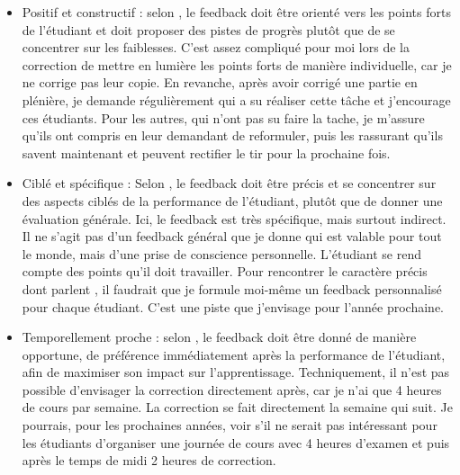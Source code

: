 \begin{itemize}
    \item Positif et constructif : selon \citet{hattie2007power}, le feedback doit être orienté vers les points forts de l'étudiant et doit proposer des pistes de progrès plutôt que de se concentrer sur les faiblesses. C'est assez compliqué pour moi lors de la correction de mettre en lumière les points forts de manière individuelle, car je ne corrige pas leur copie. En revanche, après avoir corrigé une partie en plénière, je demande régulièrement qui a su réaliser cette tâche et j’encourage ces étudiants. Pour les autres, qui n'ont pas su faire la tache, je m'assure qu'ils ont compris en leur demandant de reformuler, puis les rassurant qu’ils savent maintenant et peuvent rectifier le tir pour la prochaine fois.
    \item Ciblé et spécifique : Selon \citet{black1998assessment}, le feedback doit être précis et se concentrer sur des aspects ciblés de la performance de l'étudiant, plutôt que de donner une évaluation générale. Ici, le feedback est très spécifique, mais surtout indirect. Il ne s'agit pas d'un feedback général que je donne qui est valable pour tout le monde, mais d'une prise de conscience personnelle. L'étudiant se rend compte des points qu'il doit travailler. Pour rencontrer le caractère précis dont parlent \cite{black1998assessment}, il faudrait que je formule moi-même un feedback personnalisé pour chaque étudiant. C'est une piste que j'envisage pour l'année prochaine.
    \item Temporellement proche : selon \citet{kluger1996effects}, le feedback doit être donné de manière opportune, de préférence immédiatement après la performance de l'étudiant, afin de maximiser son impact sur l'apprentissage. Techniquement, il n'est pas possible d'envisager la correction directement après, car je n'ai que 4 heures de cours par semaine. La correction se fait directement la semaine qui suit. Je pourrais, pour les prochaines années, voir s'il ne serait pas intéressant pour les étudiants d'organiser une journée de cours avec 4 heures d'examen et puis après le temps de midi 2 heures de correction.
\end{itemize}

